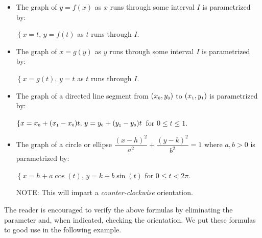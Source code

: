 \documentclass{ximera}
\begin{document}
\begin{itemize}

\item  The graph of  $y=f(x)$ as $x$ runs through some interval $I$ is parametrized by:

$\left\{ x = t, \, y = f(t) \right.$ as  $t$ runs through $I$.

\item  The graph of  $x=g(y)$ as $y$ runs through some interval $I$ is parametrized by:

$\left\{ x = g(t), \, y = t \right.$ as  $t$ runs through $I$.

\item  The graph of a  directed line segment from $(x_{\text{\tiny$0$}}, y_{\text{\tiny$0$}})$ to $(x_{\text{\tiny$1$}}, y_{\text{\tiny$1$}})$ is parametrized by:

$\left\{ x  = x_{\text{\tiny$0$}} + (x_{\text{\tiny$1$}} - x_{\text{\tiny$0$}}) t, \, y = y_{\text{\tiny$0$}} + (y_{\text{\tiny$1$}} - y_{\text{\tiny$0$}}) t \right.$  for $0 \leq t \leq 1$.



\item  The graph of a circle or ellipse $\dfrac{(x-h)^2}{a^2} + \dfrac{(y-k)^2}{b^2} = 1$ where $a,b > 0$ is parametrized by:

$\left\{ x =  h+a\cos(t), \, y = k+b\sin(t) \right.$  for $0 \leq t < 2\pi$. 

NOTE:  This will impart a \textit{counter-clockwise} orientation.

\end{itemize}

\smallskip


\smallskip

The reader is encouraged to verify the above formulas by eliminating the parameter and, when indicated, checking the orientation.  We put these formulas to good use in the following example.
\end{document}
